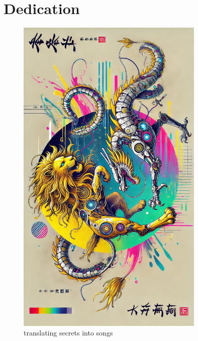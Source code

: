 \section*{Dedication}
\begin{figure}[h!]
    \centering
    \includegraphics[width=0.8\textwidth]{figures/lion.jpeg}
    \caption{translating secrets into songs}
    \label{fig:lion}
\end{figure}
